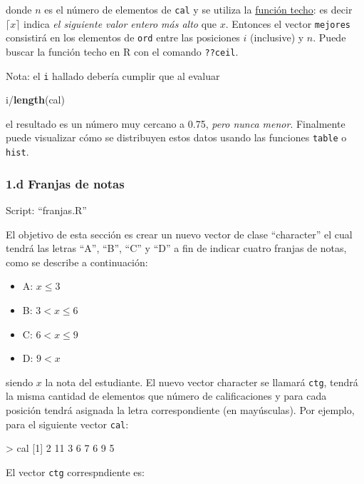 \documentclass[]{article}
\newenvironment{Shaded}{}{}
\newcommand{\KeywordTok}[1]{\textcolor[rgb]{0.00,0.44,0.13}{\textbf{{#1}}}}
\newcommand{\DecValTok}[1]{\textcolor[rgb]{0.25,0.63,0.44}{{#1}}}
\newcommand{\NormalTok}[1]{{#1}}
\begin{document}
donde $n$ es el número de elementos de \texttt{cal} y se utiliza la
\href{https://es.wikipedia.org/wiki/Funciones\_de\_parte\_entera\#Funci.C3.B3n\_techo}{función
techo}: es decir $\lceil x \rceil$ indica \emph{el siguiente valor
entero más alto} que $x$. Entonces el vector \texttt{mejores} consistirá
en los elementos de \texttt{ord} entre las posiciones $i$ (inclusive) y
$n$. Puede buscar la función techo en R con el comando \texttt{??ceil}.

Nota: el \texttt{i} hallado debería cumplir que al evaluar

\begin{Shaded}
\begin{Highlighting}[]
\NormalTok{i/}\KeywordTok{length}\NormalTok{(cal)}
\end{Highlighting}
\end{Shaded}
el resultado es un número muy cercano a 0.75, \emph{pero nunca menor}.
Finalmente puede visualizar cómo se distribuyen estos datos usando las
funciones \texttt{table} o \texttt{hist}.

\subsubsection{1.d Franjas de notas}

Script: ``franjas.R''

El objetivo de esta sección es crear un nuevo vector de clase
``character'' el cual tendrá las letras ``A'', ``B'', ``C'' y ``D'' a
fin de indicar cuatro franjas de notas, como se describe a continuación:

\begin{itemize}
\item
  A: $x \leq 3$
\item
  B: $3 < x \leq 6$
\item
  C: $6 < x \leq 9$
\item
  D: $9 < x$
\end{itemize}
siendo $x$ la nota del estudiante. El nuevo vector character se llamará
\texttt{ctg}, tendrá la misma cantidad de elementos que número de
calificaciones y para cada posición tendrá asignada la letra
correspondiente (en mayúsculas). Por ejemplo, para el siguiente vector
\texttt{cal}:

\begin{Shaded}
\begin{Highlighting}[]
\NormalTok{> cal}
\NormalTok{[}\DecValTok{1}\NormalTok{]  }\DecValTok{2} \DecValTok{11}  \DecValTok{3}  \DecValTok{6}  \DecValTok{7}  \DecValTok{6}  \DecValTok{9} \DecValTok{5}
\end{Highlighting}
\end{Shaded}
El vector \texttt{ctg} correspndiente es:
\end{document}
